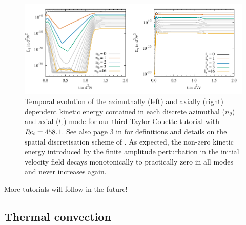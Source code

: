 \documentclass[a4paper, 11pt, DIV=11]{scrartcl}
\begin{document}
\begin{figure}[htb]
\centering
\includegraphics[scale=1.00]{figures/tc0042/keThZ.pdf}
\caption{Temporal evolution of the azimuthally (left) and axially (right) 
dependent kinetic energy contained in each discrete azimuthal ($n_{\theta}$)
and axial ($l_{z}$) mode for our third Taylor-Couette tutorial 
with $R\hspace{-0.1em}e_{i}=\num{458.1}$. See also page 3 in \cite{Shi2015} for definitions and 
details on the spatial discretisation scheme of \nsc. As expected, the non-zero 
kinetic energy introduced by the finite amplitude perturbation in the initial 
velocity field decays monotonically to practically zero in all modes and never 
increases again.}
\label{fig:tc0042keThZ}
\end{figure}
More tutorials will follow in the future!






\subsection{Thermal convection}
\label{sec:tc0073}
\end{document}
